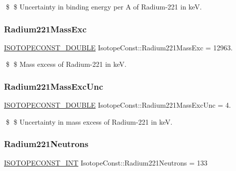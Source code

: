 \$ \$ Uncertainty in binding energy per A of Radium-\/221 in keV. \mbox{\label{group___isotope_const-_radium-_ra221_ga25119678beba3d6be97f60fce7989a7b}} 
\subsubsection{\texorpdfstring{Radium221\+Mass\+Exc}{Radium221MassExc}}
{\footnotesize\ttfamily \mbox{\hyperlink{group___isotope_const-_macros_ga8f45a7272ce02c0b4c65c44636ed719a}{I\+S\+O\+T\+O\+P\+E\+C\+O\+N\+S\+T\+\_\+\+D\+O\+U\+B\+LE}} Isotope\+Const\+::\+Radium221\+Mass\+Exc = 12963.}

\$ \$ Mass excess of Radium-\/221 in keV. \mbox{\label{group___isotope_const-_radium-_ra221_ga16b49567a8e2336ff61962488a3e0f58}} 
\subsubsection{\texorpdfstring{Radium221\+Mass\+Exc\+Unc}{Radium221MassExcUnc}}
{\footnotesize\ttfamily \mbox{\hyperlink{group___isotope_const-_macros_ga8f45a7272ce02c0b4c65c44636ed719a}{I\+S\+O\+T\+O\+P\+E\+C\+O\+N\+S\+T\+\_\+\+D\+O\+U\+B\+LE}} Isotope\+Const\+::\+Radium221\+Mass\+Exc\+Unc = 4.}

\$ \$ Uncertainty in mass excess of Radium-\/221 in keV. \mbox{\label{group___isotope_const-_radium-_ra221_ga614627afd57e8df955e1e40f3a305d7f}} 
\subsubsection{\texorpdfstring{Radium221\+Neutrons}{Radium221Neutrons}}
{\footnotesize\ttfamily \mbox{\hyperlink{group___isotope_const-_macros_ga5f18360b3e99483a35c32d789e62621c}{I\+S\+O\+T\+O\+P\+E\+C\+O\+N\+S\+T\+\_\+\+I\+NT}} Isotope\+Const\+::\+Radium221\+Neutrons = 133}

